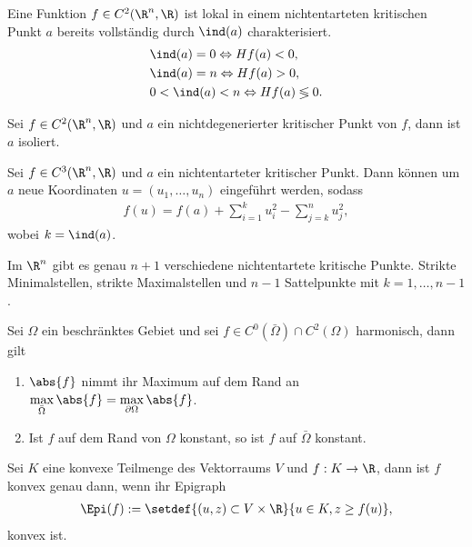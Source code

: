 \begin{prop}
Eine Funktion $f\in C^2(\R^n,\R)$ ist lokal in einem nichtentarteten kritischen
Punkt $a$ bereits vollständig durch $\ind(a)$ charakterisiert.
\begin{align*}
&\ind(a) = 0 \Leftrightarrow Hf(a) < 0,\\
&\ind(a) = n \Leftrightarrow Hf(a) > 0,\\
&0 < \ind(a) < n \Leftrightarrow Hf(a) \lessgtr 0.
\end{align*}
\end{prop}
\begin{prop}
Sei $f\in C^2(\R^n,\R)$ und $a$ ein nichtdegenerierter kritischer Punkt von $f$,
dann ist $a$ isoliert.
\end{prop}
\begin{prop}
Sei $f\in C^3(\R^n,\R)$ und $a$ ein nichtentarteter kritischer Punkt. Dann
können um $a$ neue Koordinaten $u = (u_1,\ldots,u_n)$ eingeführt werden, sodass
\begin{align*}
f(u) = f(a) + \sum\limits_{i=1}^k u_i^2 - \sum\limits_{j=k}^n u_j^2,
\end{align*}
wobei $k = \ind(a)$.
\end{prop}
\begin{prop}
Im $\R^n$ gibt es genau $n+1$ verschiedene nichtentartete kritische Punkte.
Strikte Minimalstellen, strikte Maximalstellen und $n-1$ Sattelpunkte mit $k =
1, \ldots, n-1$.
\end{prop}
\begin{prop}
Sei $\Omega$ ein beschränktes Gebiet und sei $f\in C^0(\bar{\Omega})\cap
C^2(\Omega)$ harmonisch, dann gilt
\begin{enumerate}
  \item $\abs{f}$ nimmt ihr Maximum auf dem Rand an $\max\limits_{\bar{\Omega}}
  \abs{f} = \max\limits_{\partial\Omega} \abs{f}$.
  \item Ist $f$ auf dem Rand von $\Omega$ konstant, so ist $f$ auf
  $\bar{\Omega}$ konstant.
\end{enumerate}
\end{prop}
\begin{prop}
Sei $K$ eine konvexe Teilmenge des Vektorraums $V$ und $f: K\to\R$, dann ist $f$
konvex genau dann, wenn ihr Epigraph
\begin{align*}
\Epi(f) := \setdef{(u,z)\subset V\times\R}{u\in K, z \ge f(u)},
\end{align*}
konvex ist.
\end{prop}
